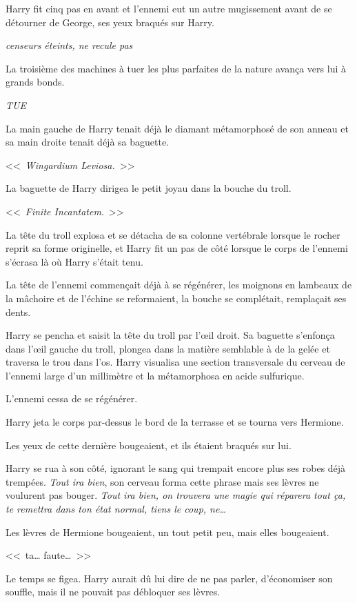 Harry fit cinq pas en avant et l'ennemi eut un autre mugissement avant de se détourner de George, ses yeux braqués sur Harry.

\emph{censeurs éteints, ne recule pas}

La troisième des machines à tuer les plus parfaites de la nature avança vers lui à grands bonds.

\emph{TUE}

La main gauche de Harry tenait déjà le diamant métamorphosé de son anneau et sa main droite tenait déjà sa baguette.

<<~\emph{Wingardium Leviosa.}~>>

La baguette de Harry dirigea le petit joyau dans la bouche du troll.

<<~\emph{Finite Incantatem}.~>>

La tête du troll explosa et se détacha de sa colonne vertébrale lorsque le rocher reprit sa forme originelle, et Harry fit un pas de côté lorsque le corps de l'ennemi s'écrasa là où Harry s'était tenu.

La tête de l'ennemi commençait déjà à se régénérer, les moignons en lambeaux de la mâchoire et de l'échine se reformaient, la bouche se complétait, remplaçait ses dents.

Harry se pencha et saisit la tête du troll par l'œil droit. Sa baguette s'enfonça dans l'œil gauche du troll, plongea dans la matière semblable à de la gelée et traversa le trou dans l'os. Harry visualisa une section transversale du cerveau de l'ennemi large d'un millimètre et la métamorphosa en acide sulfurique.

L'ennemi cessa de se régénérer.

Harry jeta le corps par-dessus le bord de la terrasse et se tourna vers Hermione.

Les yeux de cette dernière bougeaient, et ils étaient braqués sur lui.

Harry se rua à son côté, ignorant le sang qui trempait encore plus ses robes déjà trempées. \emph{Tout ira bien}, son cerveau forma cette phrase mais ses lèvres ne voulurent pas bouger. \emph{Tout ira bien, on trouvera une magie qui réparera tout ça, te remettra dans ton état normal, tiens le coup, ne…}

Les lèvres de Hermione bougeaient, un tout petit peu, mais elles bougeaient.

<<~ta… faute…~>>

Le temps se figea. Harry aurait dû lui dire de ne pas parler, d'économiser son souffle, mais il ne pouvait pas débloquer ses lèvres.

